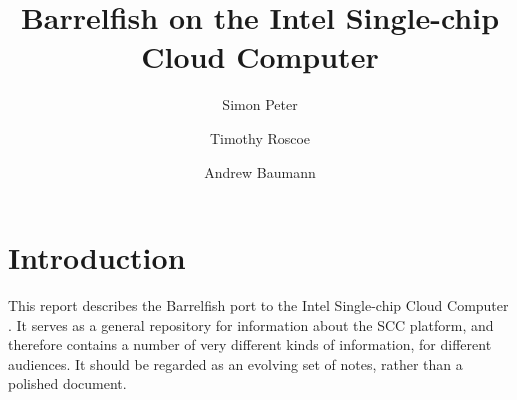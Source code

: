 \documentclass[a4paper,twoside]{report} %
\title{Barrelfish on the Intel Single-chip Cloud Computer}   %
\author{Simon Peter \and Timothy Roscoe \and Andrew Baumann}	%
\begin{document}
\maketitle

%
%
\begin{versionhistory}
\end{versionhistory}



\newcommand{\eclipse}{ECL\textsuperscript{i}PS\textsuperscript{e}\xspace}
\newcommand{\codesize}{\scriptsize}
\newcommand{\note}[1]{[\textcolor{red}{\emph{#1}}]}

\chapter{Introduction}

This report describes the Barrelfish port to the Intel Single-chip
Cloud Computer \cite{intel:scc:isscc10}.   It serves as a general
repository for information about the SCC platform, and therefore
contains a number of very different kinds of information, for
different audiences.  It should be regarded as an evolving set of
notes, rather than a polished document. 
\end{document}
